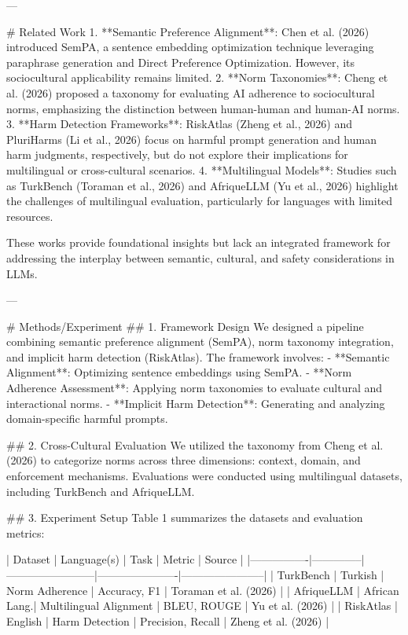 ---

# Related Work  
1. **Semantic Preference Alignment**: Chen et al. (2026) introduced SemPA, a sentence embedding optimization technique leveraging paraphrase generation and Direct Preference Optimization. However, its sociocultural applicability remains limited.  
2. **Norm Taxonomies**: Cheng et al. (2026) proposed a taxonomy for evaluating AI adherence to sociocultural norms, emphasizing the distinction between human-human and human-AI norms.  
3. **Harm Detection Frameworks**: RiskAtlas (Zheng et al., 2026) and PluriHarms (Li et al., 2026) focus on harmful prompt generation and human harm judgments, respectively, but do not explore their implications for multilingual or cross-cultural scenarios.  
4. **Multilingual Models**: Studies such as TurkBench (Toraman et al., 2026) and AfriqueLLM (Yu et al., 2026) highlight the challenges of multilingual evaluation, particularly for languages with limited resources.  

These works provide foundational insights but lack an integrated framework for addressing the interplay between semantic, cultural, and safety considerations in LLMs.

---

# Methods/Experiment  
## 1. Framework Design  
We designed a pipeline combining semantic preference alignment (SemPA), norm taxonomy integration, and implicit harm detection (RiskAtlas). The framework involves:  
- **Semantic Alignment**: Optimizing sentence embeddings using SemPA.  
- **Norm Adherence Assessment**: Applying norm taxonomies to evaluate cultural and interactional norms.  
- **Implicit Harm Detection**: Generating and analyzing domain-specific harmful prompts.

## 2. Cross-Cultural Evaluation  
We utilized the taxonomy from Cheng et al. (2026) to categorize norms across three dimensions: context, domain, and enforcement mechanisms. Evaluations were conducted using multilingual datasets, including TurkBench and AfriqueLLM.

## 3. Experiment Setup  
Table 1 summarizes the datasets and evaluation metrics:  

| Dataset        | Language(s)  | Task                   | Metric               | Source                |  
|----------------|--------------|------------------------|----------------------|-----------------------|  
| TurkBench      | Turkish      | Norm Adherence         | Accuracy, F1         | Toraman et al. (2026) |  
| AfriqueLLM     | African Lang.| Multilingual Alignment | BLEU, ROUGE          | Yu et al. (2026)      |  
| RiskAtlas      | English      | Harm Detection         | Precision, Recall    | Zheng et al. (2026)   |  

